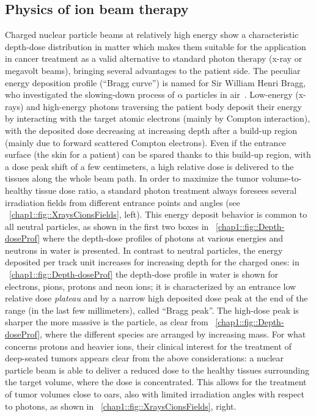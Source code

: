 \subsection{Physics of ion beam therapy}\label{chap1::subsec::Physics}
Charged nuclear particle beams at relatively high energy show a characteristic depth-dose distribution in matter which makes them suitable for the application in cancer treatment as a valid alternative to standard photon therapy (x-ray or megavolt beams), bringing several advantages to the patient side. The peculiar energy deposition profile (\enquote{Bragg curve}) is named for Sir William Henri Bragg, who investigated the slowing-down process of $\mathrm{\alpha}$ particles in air~\parencite{Bragg1904, Bragg1905}. 
Low-energy (x-rays) and high-energy photons traversing the patient body deposit their energy by interacting with the target atomic electrons (mainly by Compton interaction), with the deposited dose decreasing at increasing depth after a build-up region (mainly due to forward scattered Compton electrons). Even if the entrance surface (the skin for a patient) can be spared thanks to this build-up region, with a dose peak shift of a few centimeters, a high relative dose is delivered to the tissues along the whole beam path. In order to maximize the tumor volume-to-healthy tissue dose ratio, a standard photon treatment always foresees several irradiation fields from different entrance points and angles (see \figurename~\ref{chap1::fig::XraysCionsFields}, left). This energy deposit behavior is common to all neutral particles, as shown in the first two boxes in \figurename~\ref{chap1::fig::Depth-doseProf} where the depth-dose profiles of photons at various energies and neutrons in water is presented. 
In contrast to neutral particles, the energy deposited per track unit increases for increasing depth for the charged ones: in \figurename~\ref{chap1::fig::Depth-doseProf} the depth-dose profile in water is shown for electrons, pions, protons and neon ions; it is characterized by an entrance low relative dose \textit{plateau} and by a narrow high deposited dose peak at the end of the range (in the last few millimeters), called \enquote{Bragg peak}. The high-dose peak is sharper the more massive is the particle, as clear from \figurename~\ref{chap1::fig::Depth-doseProf}, where the different species are arranged by increasing mass. For what concerns protons and heavier ions, their clinical interest for the treatment of deep-seated tumors appears clear from the above considerations: a nuclear particle beam is able to deliver a reduced dose to the healthy tissues surrounding the target volume, where the dose is concentrated. This allows for the treatment of tumor volumes close to \glspl{oar}, also with limited irradiation angles with respect to photons, as shown in \figurename~\ref{chap1::fig::XraysCionsFields}, right. 

